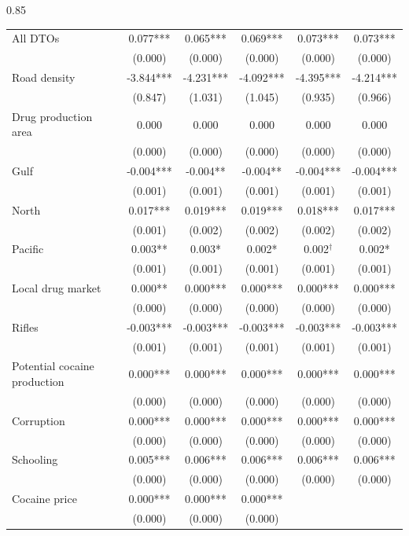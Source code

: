 \documentclass[12pt,letterpaper]{article}
\begin{document}
\begin{landscape}
\begin{center}
\begin{spacing}{0.85}
\begin{longtable}{lccccc}
All DTOs & 0.077*** & 0.065*** & 0.069*** & 0.073*** & 0.073***  \\ 
 & (0.000)  & (0.000)  & (0.000)  & (0.000)  & (0.000)   \\ 
Road density & -3.844*** & -4.231*** & -4.092*** & -4.395*** & -4.214***  \\ 
 & (0.847)  & (1.031)  & (1.045)  & (0.935)  & (0.966)   \\ 
Drug production area & 0.000  & 0.000  & 0.000  & 0.000  & 0.000  \\ 
 & (0.000)  & (0.000)  & (0.000)  & (0.000)  & (0.000)   \\ 
Gulf & -0.004*** & -0.004** & -0.004** & -0.004*** & -0.004***  \\ 
 & (0.001)  & (0.001)  & (0.001)  & (0.001)  & (0.001)   \\ 
North & 0.017*** & 0.019*** & 0.019*** & 0.018*** & 0.017***  \\ 
 & (0.001)  & (0.002)  & (0.002)  & (0.002)  & (0.002)   \\ 
Pacific & 0.003** & 0.003* & 0.002* & 0.002$^{\dag}$ & 0.002*  \\ 
 & (0.001)  & (0.001)  & (0.001)  & (0.001)  & (0.001)   \\ 
Local drug market & 0.000** & 0.000*** & 0.000*** & 0.000*** & 0.000***  \\ 
 & (0.000)  & (0.000)  & (0.000)  & (0.000)  & (0.000)   \\ 
                 
Rifles & -0.003*** & -0.003*** & -0.003*** & -0.003*** & -0.003***  \\ 
 & (0.001)  & (0.001)  & (0.001)  & (0.001)  & (0.001)   \\ 
Potential cocaine production & 0.000*** & 0.000*** & 0.000*** & 0.000*** & 0.000***  \\ 
 & (0.000)  & (0.000)  & (0.000)  & (0.000)  & (0.000)   \\ 
Corruption & 0.000*** & 0.000*** & 0.000*** & 0.000*** & 0.000***  \\ 
 & (0.000)  & (0.000)  & (0.000)  & (0.000)  & (0.000)   \\ 
Schooling & 0.005*** & 0.006*** & 0.006*** & 0.006*** & 0.006***  \\ 
 & (0.000)  & (0.000)  & (0.000)  & (0.000)  & (0.000)   \\ 
Cocaine price & 0.000*** & 0.000*** & 0.000*** &  &   \\ 
 & (0.000)  & (0.000)  & (0.000)  &  &    \\ 
                 

\end{longtable}
\end{spacing}
\end{center}
\end{landscape}
\end{document}

